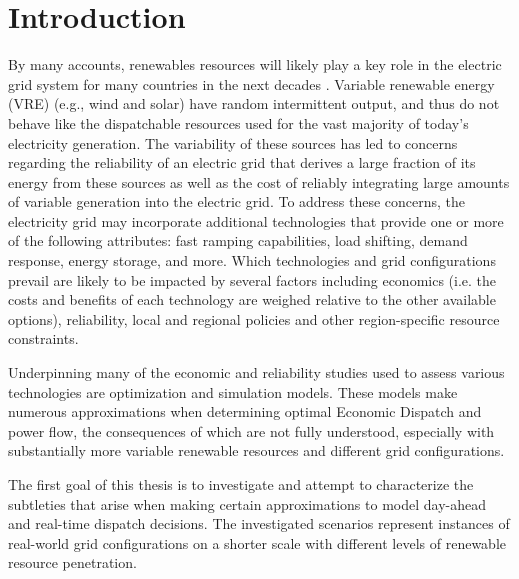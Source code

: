 \documentclass[12pt,LUDisStyle,twosided]{book}
\begin{document}
\pagestyle{plain}
\dissertationtrue



\tableofcontents
\nopagebreak
{}
\listoftables
{}
\listoffigures
\newpage
\pagestyle{plain}

\pagestyle{plain}

\chapter{Introduction}

By many accounts, renewables resources will likely play a key role in the electric grid system for many countries in the next decades \cite{rahmangreen}.  Variable renewable energy (VRE) (e.g., wind and solar) have random intermittent output, and thus do not behave like the dispatchable resources used for the vast majority of today's electricity generation. The variability of these sources has led to concerns regarding the reliability of an electric grid that derives a large fraction of its energy from these sources as well as the cost of reliably integrating large amounts of variable generation into the electric grid. To address these concerns, the electricity grid may incorporate additional technologies that provide one or more of the following attributes: fast ramping capabilities, load shifting, demand response, energy storage, and more.   Which technologies and grid configurations prevail are likely to be impacted by several factors including economics (i.e. the costs and benefits of each technology are weighed relative to the other available options), reliability, local and regional policies and other region-specific resource constraints.

Underpinning many of the economic and reliability studies used to assess various technologies are optimization and simulation models.  These models make numerous approximations when determining optimal Economic Dispatch and power flow, the consequences of which are not fully understood, especially with substantially more variable renewable resources and different grid configurations. 

The first goal of this thesis is to investigate and attempt to characterize the subtleties that arise when making certain approximations to model day-ahead and real-time dispatch decisions. The investigated scenarios represent instances of real-world grid configurations on a shorter scale with different levels of renewable resource penetration.
\end{document}

